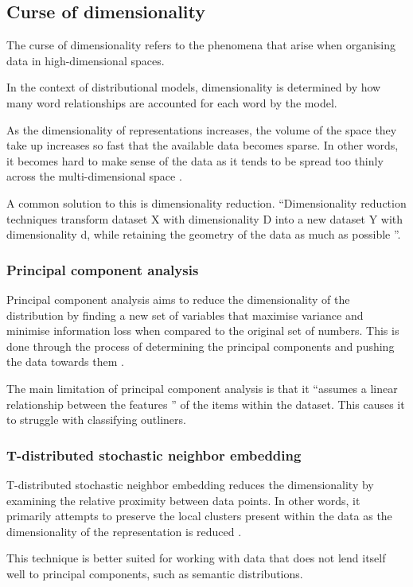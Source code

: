 \documentclass[14pt, a4paper]{extreport}
\begin{document}
    \subsection{Curse of dimensionality}
The curse of dimensionality refers to the phenomena that arise when organising data in high-dimensional spaces.

In the context of distributional models, dimensionality is determined by how many word relationships are accounted for each word by the model.

As the dimensionality of representations increases, the volume of the space they take up increases so fast that the available data becomes sparse. In other words, it becomes hard to make sense of the data as it tends to be spread too thinly across the multi-dimensional space \parencite{venkat}.

A common solution to this is dimensionality reduction. ``Dimensionality reduction techniques transform dataset X with dimensionality D into a new dataset Y with dimensionality d, while retaining the geometry of the data as much as possible \parencite{sorzano}''.
      \subsubsection{Principal component analysis}
Principal component analysis aims to reduce the dimensionality of the distribution by finding a new set of variables that maximise variance and minimise information loss when compared to the original set of numbers. This is done through the process of determining the principal components and pushing the data towards them \parencite{richardson}.

The main limitation of principal component analysis is that it ``assumes a linear relationship between the features \parencite{hoz}'' of the items within the dataset. This causes it to struggle with classifying outliners.
      \subsubsection{T-distributed stochastic neighbor embedding}
T-distributed stochastic neighbor embedding reduces the dimensionality by examining the relative proximity between data points. In other words, it primarily attempts to preserve the local clusters present within the data as the dimensionality of the representation is reduced \parencite{van}.

This technique is better suited for working with data that does not lend itself well to principal components, such as semantic distributions.
\end{document}
